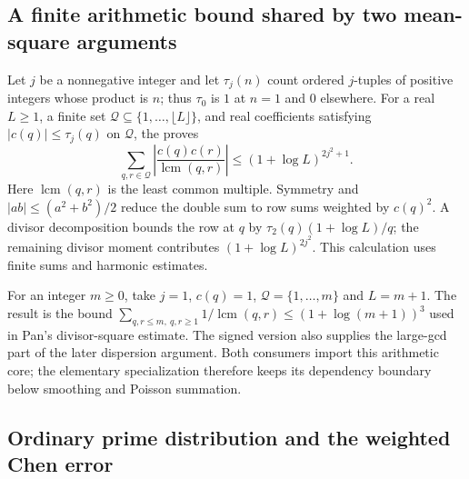 \subsection{A finite arithmetic bound shared by two mean-square arguments}

Let $j$ be a nonnegative integer and let $\tau_j(n)$ count ordered $j$-tuples
of positive integers whose product is $n$; thus $\tau_0$ is $1$ at $n=1$
and $0$ elsewhere. For a real $L\ge1$, a finite set
$\mathcal Q\subseteq\{1,\ldots,\lfloor L\rfloor\}$, and real coefficients satisfying
$|c(q)|\le\tau_j(q)$ on $\mathcal Q$, the
proves
\[
 \sum_{q,r\in\mathcal Q}\left|\frac{c(q)c(r)}{\operatorname{lcm}(q,r)}\right|
 \le (1+\log L)^{2j^2+1}.
\]
Here $\operatorname{lcm}(q,r)$ is the least common multiple.
Symmetry and $|ab|\le(a^2+b^2)/2$ reduce the double sum to row sums weighted
by $c(q)^2$. A divisor decomposition bounds the row at $q$ by
$\tau_2(q)(1+\log L)/q$; the remaining divisor moment contributes
$(1+\log L)^{2j^2}$. This calculation uses finite sums and harmonic estimates.

For an integer $m\ge0$, take $j=1$, $c(q)=1$, $\mathcal Q=\{1,\ldots,m\}$ and
$L=m+1$. The result is the bound
$\sum_{q,r\le m,\ q,r\ge1}1/\operatorname{lcm}(q,r)
\le(1+\log(m+1))^3$ used in Pan's divisor-square estimate.
The signed version also supplies the large-gcd part of the later dispersion
argument. Both consumers import this arithmetic core; the elementary
specialization therefore keeps its dependency boundary below smoothing and
Poisson summation.

\subsection{Ordinary prime distribution and the weighted Chen error}

